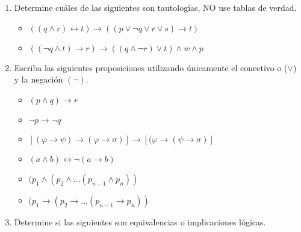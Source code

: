 \begin{enumerate}
\item Determine cuáles de las siguientes son tautologías, NO use tablas de verdad.

\begin{multicols}{2}

  \begin{itemize}
  \item $( (q \wedge r) \leftrightarrow t ) \rightarrow ( (p \vee \neg q  \vee r \vee s ) \rightarrow  t) $
  \end{itemize}

\columnbreak

  \begin{itemize}
  \item $((\neg q \wedge t ) \rightarrow r ) \rightarrow ((q \wedge \neg r) \vee t ) \wedge w \wedge p $
  \end{itemize}

\end{multicols}

\item Escriba las siguientes proposiciones utilizando únicamente el conectivo o ($\vee$) y la negación $(\neg)$.

\begin{multicols}{2}

  \begin{itemize}
  \item $(p \wedge q ) \rightarrow r $
  \item $\neg p \rightarrow \neg q $
  \item $[(\varphi \rightarrow \psi) \rightarrow (\varphi \rightarrow \sigma)] \rightarrow [(\varphi \rightarrow (\psi \rightarrow \sigma)]$
  \end{itemize}

\columnbreak

  \begin{itemize}
  \item $(a \wedge b) \leftrightarrow \neg ( a \rightarrow b )$
  \item $(p_{1} \wedge (p_{2} \wedge ... (p_{n-1} \wedge p_{n}))$
  \item $(p_{1} \rightarrow (p_{2} \rightarrow ... (p_{n-1} \rightarrow p_{n}))$
  \end{itemize}

\end{multicols}

\item Determine si las siguientes son equivalencias o implicaciones lógicas.


\end{enumerate}
